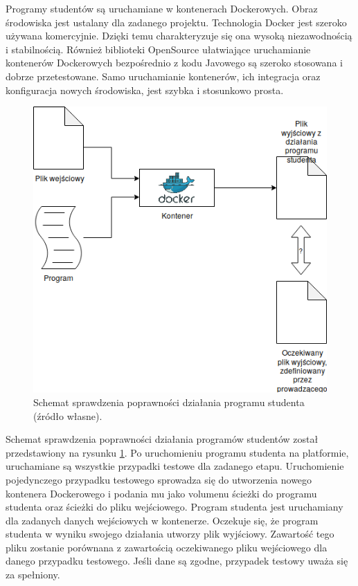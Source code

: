 Programy studentów są uruchamiane w kontenerach Dockerowych.
Obraz środowiska jest ustalany dla zadanego projektu.
Technologia Docker jest szeroko używana komercyjnie.
Dzięki temu charakteryzuje się ona wysoką niezawodnością i stabilnością.
Również biblioteki OpenSource ułatwiające uruchamianie kontenerów Dockerowych bezpośrednio z kodu Javowego są szeroko stosowana i dobrze przetestowane.
Samo uruchamianie kontenerów, ich integracja oraz konfiguracja nowych środowiska, jest szybka i stosunkowo prosta.

\begin{figure}[h]
    \centering
    \includegraphics[width = 13cm]{chapter02/single_test_case.png}
    \caption{Schemat sprawdzenia poprawności działania programu studenta (źródło własne).}
    \label{fig:single-test-case}
\end{figure}

Schemat sprawdzenia poprawności działania programów studentów został przedstawiony na rysunku \ref{fig:single-test-case}.
Po uruchomieniu programu studenta na platformie, uruchamiane są wszystkie przypadki testowe dla zadanego etapu.
Uruchomienie pojedynczego przypadku testowego sprowadza się do utworzenia nowego kontenera Dockerowego i podania mu jako volumenu ścieżki do programu studenta oraz ścieżki do pliku wejściowego.
Program studenta jest uruchamiany dla zadanych danych wejściowych w kontenerze.
Oczekuje się, że program studenta w wyniku swojego działania utworzy plik wyjściowy.
Zawartość tego pliku zostanie porównana z zawartością oczekiwanego pliku wejściowego dla danego przypadku testowego. Jeśli dane są zgodne, przypadek testowy uważa się za spełniony.

